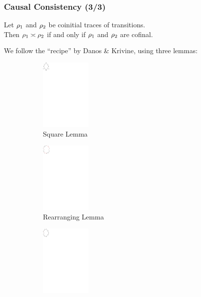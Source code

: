 \documentclass[12pt]{beamer}
\begin{document}
\begin{frame}
	\frametitle{Causal Consistency (3/3)}
	\vspace{-3mm}
	\begin{theorem}\label{t:causal}
 Let $\rho_1$ and $\rho_2$ be coinitial traces of transitions. \\
 Then 
 $\rho_1 \asymp \rho_2$ if and only if $\rho_1$ and $\rho_2$ are cofinal.
\end{theorem}

	We follow the ``recipe'' by Danos \& Krivine, using three  lemmas:
\begin{figure}[!t]
    \centering
    \begin{subfigure}[b]{3.7cm}
    \centering
        \includegraphics[height=3.5cm]{./img/square}
        \caption{Square Lemma %
        }
        \label{fig:square}
    \end{subfigure}
        \begin{subfigure}[b]{3.9cm}
        \centering
        \includegraphics[height=3.5cm]{./img/rearrange}
        \caption{Rearranging Lemma %
        }
        \label{fig:rearrange}
    \end{subfigure}
    \begin{subfigure}[b]{3.7cm}
    \centering
        \includegraphics[height=3.5cm]{./img/short}

\end{subfigure}
\end{figure}
\end{frame}
\end{document}
